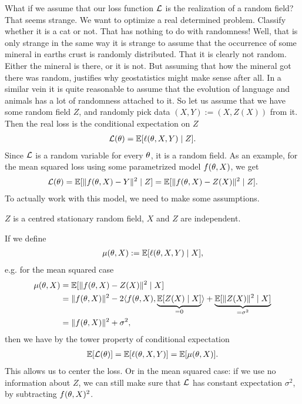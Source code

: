 What if we assume that our loss function \(\mathcal{L}\) is the
realization of a random field? That seems strange. We want to optimize a real
determined problem. Classify whether it is a cat or not. That has nothing to do
with randomness! Well, that is only strange in the same way it is strange to
assume that the occurrence of some mineral in earths crust is randomly
distributed.  That it is clearly not random. Either the mineral is there, or it
is not. But assuming that how the mineral got there was random, justifies why
geostatistics might make sense after all. In a similar vein it is quite
reasonable to assume that the evolution of language and animals has a lot of
randomness attached to it. So let us assume that we have some random field
\(Z\), and randomly pick data \((X,Y) := (X,Z(X))\) from it. Then the real loss
is the conditional expectation on \(Z\)
\begin{align*}
	\mathcal{L}(\theta) = \mathbb{E}[\ell(\theta, X,Y)\mid Z].
\end{align*}
Since \(\mathcal{L}\) is a random variable for every \(\theta\), it is a random field.
As an example, for the mean squared loss using some parametrized model
\(f(\theta, X)\), we get
\begin{align*}
	\mathcal{L}(\theta)
	= \mathbb{E}[\|f(\theta, X) - Y\|^2 \mid Z]
	= \mathbb{E}[\|f(\theta, X) - Z(X)\|^2 \mid Z].
\end{align*}
To actually work with this model, we need to make some assumptions.

\begin{axiom}
	\(Z\) is a centred stationary random field, \(X\) and \(Z\) are independent.
\end{axiom}

If we define
\begin{align*}
	\mu(\theta, X):= \mathbb{E}[\ell(\theta, X,Y)\mid X],
\end{align*}
e.g. for the mean squared case
\begin{align*}
	\mu(\theta, X)&= \mathbb{E}[\|f(\theta, X)-Z(X)\|^2 \mid X]\\
	&= \|f(\theta, X)\|^2 - 2\langle f(\theta, X), \underbrace{\mathbb{E}[Z(X)\mid X]}_{=0}\rangle
	+ \underbrace{\mathbb{E}[\|Z(X)\|^2\mid X]}_{=\sigma^2}\\
	&= \|f(\theta, X)\|^2 + \sigma^2,
\end{align*}
then we have by the tower property of conditional expectation
\begin{align*}
	\mathbb{E}[\mathcal{L}(\theta)]
	= \mathbb{E}[\ell(\theta, X,Y)]
	= \mathbb{E}[\mu(\theta, X)].
\end{align*}
This allows us to center the loss. Or in the mean squared case: if we use no
information about \(Z\), we can still make sure that \(\mathcal{L}\) has constant
expectation \(\sigma^2\), by subtracting \(f(\theta, X)^2\).


